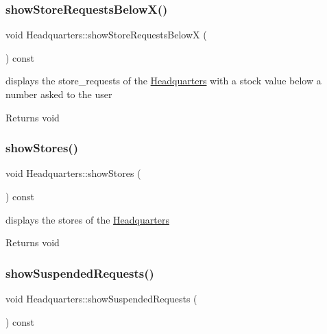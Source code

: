 \subsubsection{\texorpdfstring{show\+Store\+Requests\+Below\+X()}{showStoreRequestsBelowX()}}
{\footnotesize\ttfamily void Headquarters\+::show\+Store\+Requests\+BelowX (\begin{DoxyParamCaption}{ }\end{DoxyParamCaption}) const}



displays the store\+\_\+requests of the \hyperlink{class_headquarters}{Headquarters} with a stock value below a number asked to the user 

\begin{DoxyReturn}{Returns}
void 
\end{DoxyReturn}
\mbox{\label{class_headquarters_a5bd547ce60d0ebf56fa578686f88d207}} 
\subsubsection{\texorpdfstring{show\+Stores()}{showStores()}}
{\footnotesize\ttfamily void Headquarters\+::show\+Stores (\begin{DoxyParamCaption}{ }\end{DoxyParamCaption}) const}



displays the stores of the \hyperlink{class_headquarters}{Headquarters} 

\begin{DoxyReturn}{Returns}
void 
\end{DoxyReturn}
\mbox{\label{class_headquarters_af5180e48a82aaa4b2f0c74428aeaa589}} 
\subsubsection{\texorpdfstring{show\+Suspended\+Requests()}{showSuspendedRequests()}}
{\footnotesize\ttfamily void Headquarters\+::show\+Suspended\+Requests (\begin{DoxyParamCaption}{ }\end{DoxyParamCaption}) const}



